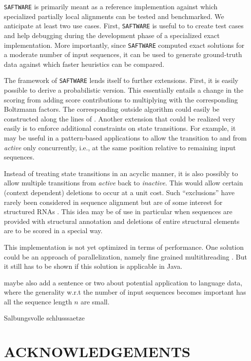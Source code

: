 \documentclass[a4paper,10pt]{article}
\newcommand{\TODO}[1]{\begingroup\color{red}#1\endgroup}
\newcommand{\PFS}[1]{\begingroup\color{green}#1\endgroup}
\newcommand{\FK}[1]{\begingroup\color{blue}#1\endgroup}
\newcommand{\SAFTWARE}{\TODO{\texttt{SAFTWARE}}}
\begin{document}
\PFS{%
\SAFTWARE{} is primarily meant as a reference implemention against which
specialized partially local alignments can be tested and benchmarked. We
anticipate at least two use cases. First, \SAFTWARE{} is useful to to
create test cases and help debugging during the development phase of a
specialized exact implementation. More importantly, since \SAFTWARE{}
computed exact solutions for a moderate number of input sequences, it can
be used to generate ground-truth data against which faster heuristics can
be compared. 

The framework of \SAFTWARE{} lends itself to further extensions. First, it
is easily possible to derive a probabilistic version. This essentially
entails a change in the scoring from adding score contributions to
multiplying with the corresponding Boltzmann factors. The corresponding
outside algorithm could easily be constructed along the lines of
\cite{Hoener:15b}. Another extension that could be realized very easily is
to enforce additional constraints on state transitions. For example, it may
be useful in a pattern-based applications to allow the transition to and
from \textit{active} only concurrently, i.e., at the same position relative
to remaining input sequences.

Instead of treating state transitions in an acyclic manner, it is also
possibly to allow multiple transitions from \textit{active} back to
\textit{inactive}. This would allow certain (context dependent) deletions
to occur at a unit cost. Such ``exclusions'' have rarely been considered in
sequence alignment but are of some interest for structured RNAs
\cite{Schirmer:13}. This idea may be of use in particular when sequences
are provided with structural annotation and deletions of entire structural
elements are to be scored in a special way.
}

\FK{
This implementation is not yet optimized in terms of performance. One solution could be an approach of parallelization, namely fine grained multithreading \cite{Martins:01}. But it still has to be shown if this solution is applicable in Java.}

\TODO{maybe also add a sentence or two about potential application to
  language data, where the generality w.r.t the number of input sequences
  becomes important has all the sequence length $n$ are small.}

\TODO{Salbungsvolle schlusssaetze}

\section*{\uppercase{Acknowledgements}}
\end{document}
